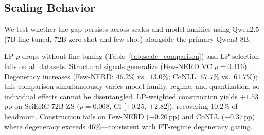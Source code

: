 \subsection{Scaling Behavior}
\label{sec:scaling}

We test whether the gap persists across scales and model families using Qwen2.5 (7B fine-tuned, 72B zero-shot and few-shot) alongside the primary Qwen3-8B.

\begin{table}[t]
\centering
\small
\caption{Cross-scale and cross-family comparison ($N{=}8$, $T{=}1.0$). Hdr.\ = oracle $-$ greedy (pp). Degen.: instance degeneracy (\%). $^\star$Qwen2.5; unmarked: Qwen3. $^\dagger$Not computed.}
\label{tab:scale_comparison}
\end{table}

LP $\rho$ drops without fine-tuning (Table~\ref{tab:scale_comparison}) and LP selection fails on all datasets. Structural signals generalize (Few-NERD VC $\rho{=}0.416$). Degeneracy increases (Few-NERD: $46.2$\% vs.\ $13.0$\%; CoNLL: $67.7$\% vs.\ $61.7$\%); this comparison simultaneously varies model family, regime, and quantization, so individual effects cannot be disentangled.
LP-weighted construction yields $+1.53$\,pp on SciERC 72B ZS ($p{=}0.008$, CI [$+0.25$, $+2.82$]), recovering $10.2$\% of headroom. Construction fails on Few-NERD ($-0.20$\,pp) and CoNLL ($-0.37$\,pp) where degeneracy exceeds $46$\%---consistent with FT-regime degeneracy gating.

